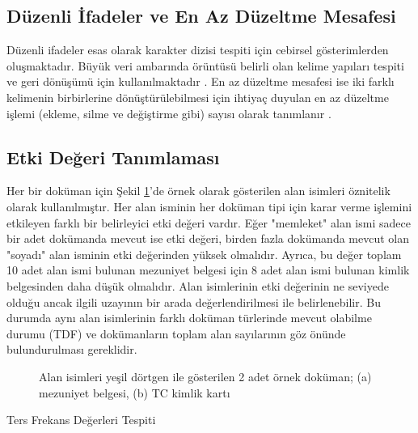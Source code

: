 \documentclass[conference, a4paper]{IEEEtran}
\begin{document}
\subsection{Düzenli İfadeler ve En Az Düzeltme Mesafesi}
Düzenli ifadeler esas olarak karakter dizisi tespiti için cebirsel gösterimlerden oluşmaktadır. Büyük veri ambarında
örüntüsü belirli olan kelime yapıları tespiti ve geri dönüşümü için kullanılmaktadır \cite{jurafsky2000speech}. En az
düzeltme mesafesi ise iki farklı kelimenin birbirlerine dönüştürülebilmesi için ihtiyaç duyulan en az düzeltme işlemi
(ekleme, silme ve değiştirme gibi) sayısı olarak tanımlanır \cite{levenshtein1966binary}.

\subsection{Etki Değeri Tanımlaması}
Her bir doküman için Şekil \ref{fig:alanisimleri}'de örnek olarak gösterilen alan isimleri öznitelik olarak
kullanılmıştır. Her alan isminin her doküman tipi için karar verme işlemini etkileyen farklı bir belirleyici etki
değeri vardır. Eğer "memleket" alan ismi sadece bir adet dokümanda mevcut ise etki değeri, birden fazla dokümanda
mevcut olan "soyadı" alan isminin etki değerinden yüksek olmalıdır. Ayrıca, bu değer toplam 10 adet alan ismi bulunan
mezuniyet belgesi için 8 adet alan ismi bulunan kimlik belgesinden daha düşük olmalıdır. Alan isimlerinin etki
değerinin ne seviyede olduğu ancak ilgili uzayının bir arada değerlendirilmesi ile belirlenebilir. Bu durumda aynı alan
isimlerinin farklı doküman türlerinde mevcut olabilme durumu (TDF) ve dokümanların toplam alan sayılarının göz önünde
bulundurulması gereklidir.

\begin{figure}
    \centering
    \shorthandoff{=}
    \par\medskip
    \caption{Alan isimleri yeşil dörtgen ile gösterilen 2  adet örnek doküman; (a) mezuniyet belgesi, (b) TC kimlik
        kartı}
    \label{fig:alanisimleri}
\end{figure}

\begin{algorithm}
    \caption{Ters Frekans Değerleri Tespiti}
    \label{alg:tersfrekans}
    \SetAlgoLined
\end{algorithm}
\end{document}
